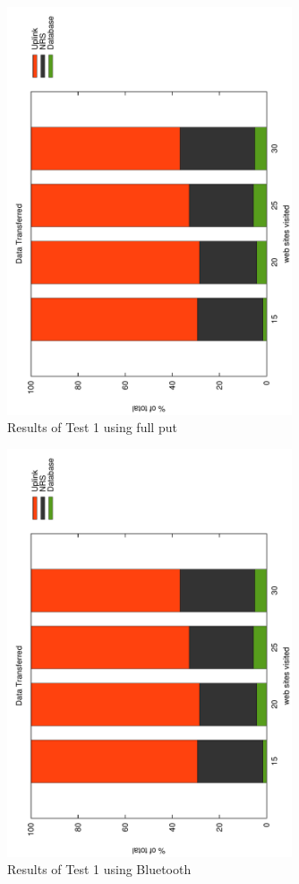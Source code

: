 \begin{figure}
	\centering
		\includegraphics[width=0.75\textwidth, angle=-90]{./img/plots.pdf}
    	\caption{Results of Test 1 using full put}
	\label{fig:frontendtest1}
\end{figure}

\begin{figure}
	\centering
		\includegraphics[width=0.75\textwidth, angle=-90]{./img/plots.pdf}
    	\caption{Results of Test 1 using Bluetooth}
	\label{fig:frontendtest1-bluetooth}
\end{figure}

